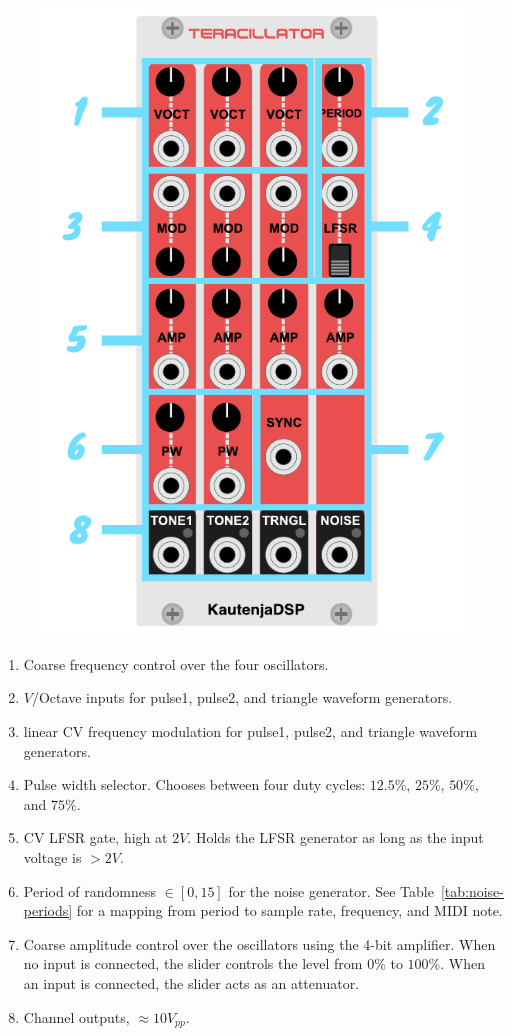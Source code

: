 \documentclass[12pt,letter]{article}
\begin{document}
\begin{figure}[!htp]
\centering
\includegraphics{Terracillator-Manual}
\end{figure}

\begin{enumerate}
  \item Coarse frequency control over the four oscillators.
  \item $V$/Octave inputs for pulse1, pulse2, and triangle waveform generators.
  \item linear CV frequency modulation for pulse1, pulse2, and triangle waveform generators.
  \item Pulse width selector. Chooses between four duty cycles: $12.5\%$, $25\%$, $50\%$, and $75\%$.
  \item CV LFSR gate, high at $2V$. Holds the LFSR generator as long as the input voltage is $>2V$.
  \item Period of randomness $\in [0, 15]$ for the noise generator. See Table~\ref{tab:noise-periods} for a mapping from period to sample rate, frequency, and MIDI note.
  \item Coarse amplitude control over the oscillators using the 4-bit amplifier. When no input is connected, the slider controls the level from $0\%$ to $100\%$. When an input is connected, the slider acts as an attenuator.
  \item Channel outputs, ${\approx}10V_{pp}$.
\end{enumerate}
\end{document}
